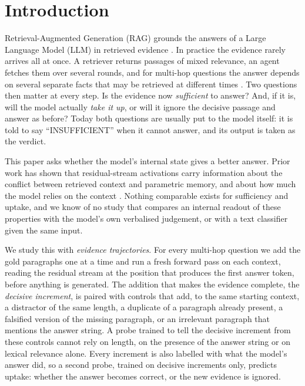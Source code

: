 \section{Introduction}
\label{sec:intro}
Retrieval-Augmented Generation (RAG) grounds the answers of a Large Language Model (LLM) in retrieved evidence \cite{NEURIPS2020_6b493230}. In practice the evidence rarely arrives all at once. A retriever returns passages of mixed relevance, an agent fetches them over several rounds, and for multi-hop questions the answer depends on several separate facts that may be retrieved at different times \cite{trivedi2022musique}. Two questions then matter at every step. Is the evidence now \emph{sufficient} to answer? And, if it is, will the model actually \emph{take it up}, or will it ignore the decisive passage and answer as before? Today both questions are usually put to the model itself: it is told to say ``INSUFFICIENT'' when it cannot answer, and its output is taken as the verdict.

This paper asks whether the model's internal state gives a better answer. Prior work has shown that residual-stream activations carry information about the conflict between retrieved context and parametric memory, and about how much the model relies on the context \cite{SpARE,context-vs-memory}. Nothing comparable exists for sufficiency and uptake, and we know of no study that compares an internal readout of these properties with the model's own verbalised judgement, or with a text classifier given the same input.

We study this with \emph{evidence trajectories}. For every multi-hop question we add the gold paragraphs one at a time and run a fresh forward pass on each context, reading the residual stream at the position that produces the first answer token, before anything is generated. The addition that makes the evidence complete, the \emph{decisive increment}, is paired with controls that add, to the same starting context, a distractor of the same length, a duplicate of a paragraph already present, a falsified version of the missing paragraph, or an irrelevant paragraph that mentions the answer string. A probe trained to tell the decisive increment from these controls cannot rely on length, on the presence of the answer string or on lexical relevance alone. Every increment is also labelled with what the model's answer did, so a second probe, trained on decisive increments only, predicts uptake: whether the answer becomes correct, or the new evidence is ignored.

